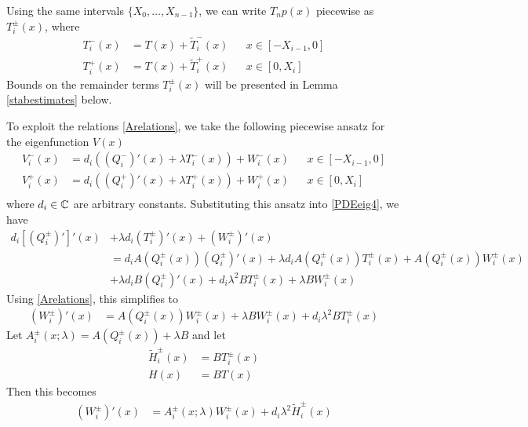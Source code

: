 \documentclass[thesis.tex]{subfiles}
\begin{document}
Using the same intervals $\{X_0, \dots, X_{n-1}\}$, we can write $T_np(x)$ piecewise as $T_i^\pm(x)$, where
\begin{equation}\label{Tnppiece}
\begin{aligned}
T_i^-(x) &= T(x) + \tilde{T}_i^-(x) && x \in [-X_{i-1}, 0] \\
T_i^+(x) &= T(x) + \tilde{T}_i^+(x) && x \in [0, X_i]
\end{aligned}
\end{equation}
Bounds on the remainder terms $T_i^\pm(x)$ will be presented in Lemma \ref{stabestimates} below.

To exploit the relations \eqref{Arelations}, we take the following piecewise ansatz for the eigenfunction $V(x)$
\begin{equation}\label{Vpiecewise}
\begin{aligned}
V_i^-(x) &= d_i ((Q_i^-)'(x) + \lambda T_i^-(x)) + W_i^-(x) && x \in [-X_{i-1}, 0] \\
V_i^+(x) &= d_i ((Q_i^+)'(x) + \lambda T_i^+(x)) + W_i^+(x) && x \in [0, X_i] \\
\end{aligned}
\end{equation}
where $d_i \in \mathbb{C}$ are arbitrary constants. Substituting this ansatz into \eqref{PDEeig4}, we have
\begin{align*}
d_i [(Q_i^\pm)']'(x) &+ \lambda d_i (T_i^\pm)'(x) + (W_i^\pm)'(x) \\
&= d_i A(Q_i^\pm(x)) (Q_i^\pm)'(x) + \lambda d_i A(Q_i^\pm(x)) T_i^\pm(x) + A(Q_i^\pm(x)) W_i^\pm(x) \\
&+ \lambda d_i B (Q_i^\pm)'(x) + d_i \lambda^2 B T_i^\pm(x) + \lambda B W_i^\pm(x)
\end{align*}
Using \eqref{Arelations}, this simplifies to
\begin{align*}
(W_i^\pm)'(x) &= A(Q_i^\pm(x)) W_i^\pm(x) + \lambda B W_i^\pm(x) + d_i \lambda^2 B T_i^\pm(x) 
\end{align*}
Let $A_i^\pm(x; \lambda) = A(Q_i^\pm(x)) + \lambda B$ and let
\begin{align*}
\tilde{H}_i^\pm(x) &= B T_i^\pm(x) \\ 
H(x) &= B T(x)
\end{align*}
Then this becomes 
\begin{align*}
(W_i^\pm)'(x) &= A_i^\pm(x; \lambda) W_i^\pm(x) + d_i \lambda^2 \tilde{H}_i^\pm(x)
\end{align*}
\end{document}
